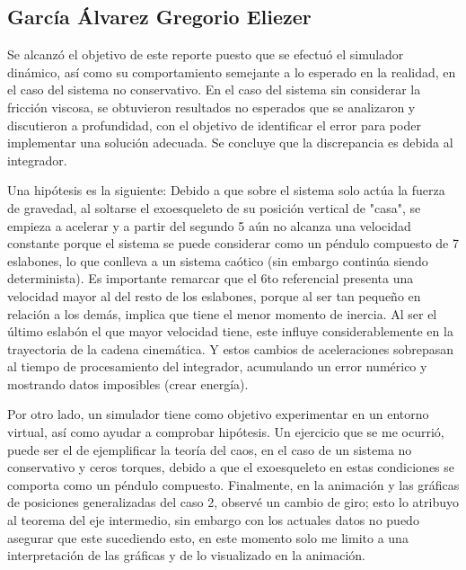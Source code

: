 \subsection{García Álvarez Gregorio Eliezer}
\noindent Se alcanzó el objetivo de este reporte  puesto que se efectuó el simulador dinámico, así como su comportamiento
semejante a lo esperado en la realidad, en el caso del sistema no conservativo.
En el caso del sistema sin considerar la fricción viscosa, se obtuvieron resultados no esperados que se analizaron
y discutieron a profundidad, con el objetivo de identificar el error para poder implementar una solución adecuada. 
Se concluye que la discrepancia es debida al integrador. 

Una hipótesis es la siguiente:
Debido a que sobre el sistema solo actúa la fuerza de gravedad, al soltarse el exoesqueleto de su posición vertical
de "casa", se empieza a acelerar y a partir del segundo 5 aún no alcanza una velocidad constante porque el sistema
se puede considerar como un péndulo compuesto de 7 eslabones, lo que conlleva a un sistema caótico (sin embargo
continúa siendo determinista). Es importante remarcar que el 6to referencial presenta una velocidad mayor al del
resto de los eslabones, porque al ser tan pequeño en relación a los demás, implica que tiene el menor momento de
inercia. Al ser el último eslabón el que mayor velocidad tiene, este influye considerablemente en la trayectoria de
la cadena cinemática. Y estos cambios de aceleraciones sobrepasan al tiempo de procesamiento del integrador, 
acumulando un error numérico y mostrando datos imposibles (crear energía).

Por otro lado, un simulador tiene como objetivo experimentar en un entorno virtual, así como ayudar a comprobar
hipótesis. Un ejercicio que se me ocurrió, puede ser el de ejemplificar la teoría del caos, en el caso de un sistema
no conservativo y ceros torques, debido a que el exoesqueleto en estas condiciones se comporta como un péndulo
compuesto. Finalmente, en la animación y las gráficas de posiciones generalizadas del caso 2, observé un cambio de 
giro; esto lo atribuyo al teorema del eje intermedio, sin embargo con los actuales datos no puedo asegurar que este
sucediendo esto, en este momento solo me limito a una interpretación de las gráficas y de lo visualizado en la
animación.